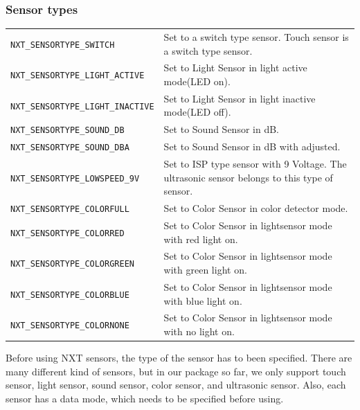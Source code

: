 \documentclass[11pt]{article}
\begin{document}
\subsubsection*{Sensor types}
\begin{longtable}{p{5.5cm}p{10cm}}
    \hline
    {\tt NXT\_SENSORTYPE\_SWITCH}       &Set to a switch type sensor. Touch 
    sensor is a switch type sensor.\\
    {\tt NXT\_SENSORTYPE\_LIGHT\_ACTIVE}&Set to Light Sensor in light active 
    mode(LED on).\\
    {\tt NXT\_SENSORTYPE\_LIGHT\_INACTIVE}&Set to Light Sensor in light inactive 
    mode(LED off).\\
    {\tt NXT\_SENSORTYPE\_SOUND\_DB}    &Set to Sound Sensor in dB.\\
    {\tt NXT\_SENSORTYPE\_SOUND\_DBA}   &Set to Sound Sensor in dB with adjusted.\\
    {\tt NXT\_SENSORTYPE\_LOWSPEED\_9V} &Set to ISP type sensor with 9 Voltage. 
    The ultrasonic sensor belongs to this type of sensor.\\
    {\tt NXT\_SENSORTYPE\_COLORFULL}    &Set to Color Sensor in color detector 
    mode.\\
    {\tt NXT\_SENSORTYPE\_COLORRED}     &Set to Color Sensor in lightsensor 
    mode with red light on.\\
    {\tt NXT\_SENSORTYPE\_COLORGREEN}   &Set to Color Sensor in lightsensor 
    mode with green light on.\\
    {\tt NXT\_SENSORTYPE\_COLORBLUE}    &Set to Color Sensor in lightsensor 
    mode with blue light on.\\
    {\tt NXT\_SENSORTYPE\_COLORNONE}    &Set to Color Sensor in lightsensor 
    mode with no light on.\\
    \hline
\end{longtable}
Before using NXT sensors, the type of the sensor has to been specified. There
are many different kind of sensors, but in our package so far, we only support 
touch sensor, light sensor, sound sensor, color sensor, and ultrasonic sensor. 
Also, each sensor has a data mode, which needs to be specified before using.
\end{document}
